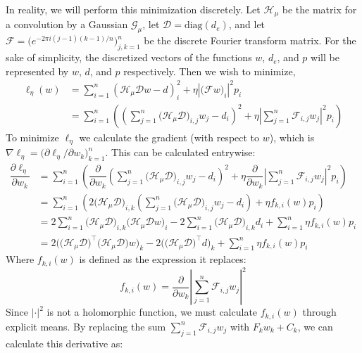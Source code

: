 \documentclass{article}
\begin{document}
In reality, we will perform this minimization discretely. Let $\mathcal H_\mu$ be the matrix for a convolution by a Gaussian $\mathcal G_\mu$, let $\mathcal D=\textrm{diag}(d_e)$, and let $\mathcal F=\big(e^{-2\pi i(j-1)(k-1)/n}\big)_{j,k=1}^n$ be the discrete Fourier transform matrix. For the sake of simplicity, the discretized vectors of the functions $w$, $d_e$, and $p$ will be represented by $w$, $d$, and $p$ respectively. Then we wish to minimize,
\begin{align*}
    \ell_\eta(w)&=\sum_{i=1}^n\left(\mathcal H_\mu\mathcal Dw-d\right)_i^2+\eta\left|\big(\mathcal Fw\big)_i\right|^2p_i \\
    &=\sum_{i=1}^n\left(\left(\sum_{j=1}^n\big(\mathcal H_\mu\mathcal D\big)_{i,j}w_j-d_i\right)^2+\eta\left|\sum_{j=1}^n\mathcal F_{i,j}w_j\right|^2p_i\right)
\end{align*}
To minimize $\ell_\eta$ we calculate the gradient (with respect to $w$), which is $\nabla\ell_\eta=\big(\partial \ell_\eta/\partial w_k\big)_{k=1}^n$. This can be calculated entrywise:
\begin{align*}
    \dfrac{\partial\ell_\eta}{\partial w_k}&=\sum_{i=1}^n\left(\dfrac{\partial}{\partial w_k}\left(\sum_{j=1}^n\big(\mathcal H_\mu\mathcal D\big)_{i,j}w_j-d_i\right)^2+\eta\dfrac{\partial}{\partial w_k}\left|\sum_{j=1}^n\mathcal F_{i,j}w_j\right|^2p_i\right) \\
    &=\sum_{i=1}^n\left(2\big(\mathcal H_\mu\mathcal D\big)_{i,k}\left(\sum_{j=1}^n\big(\mathcal H_\mu\mathcal D\big)_{i,j}w_j-d_i\right)+\eta f_{k,i}(w)p_i\right) \\
    &=2\sum_{i=1}^n\big(\mathcal H_\mu\mathcal D\big)_{i,k}\big(\mathcal H_\mu\mathcal Dw\big)_i-2\sum_{i=1}^n\big(\mathcal H_\mu\mathcal D\big)_{i,k}d_i+\sum_{i=1}^n\eta f_{k,i}(w)p_i \\ 
    &=2\Big(\big(\mathcal H_\mu\mathcal D\big)^\top\big(\mathcal H_\mu\mathcal D\big)w\Big)_k-2\Big(\big(\mathcal H_\mu\mathcal D\big)^\top d\Big)_k+\sum_{i=1}^n\eta f_{k,i}(w)p_i
\end{align*}
Where $f_{k,i}(w)$ is defined as the expression it replaces:
$$f_{k,i}(w)=\dfrac{\partial}{\partial w_k}\left|\sum_{j=1}^n\mathcal F_{i,j}w_j\right|^2$$
Since $|\cdot|^2$ is not a holomorphic function, we must calculate $f_{k,i}(w)$ through explicit means. By replacing the sum $\sum_{j=1}^n\mathcal F_{i,j}w_j$ with $F_kw_k+C_k$, we can calculate this derivative as:
\end{document}
